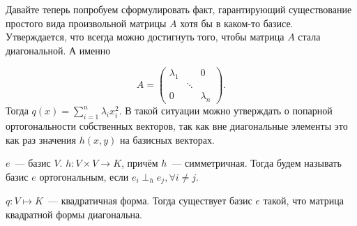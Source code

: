 Давайте теперь попробуем сформулировать факт, гарантирующий существование простого вида
произвольной матрицы $A$ хотя бы в каком-то базисе. Утверждается, что всегда можно
достигнуть того, чтобы матрица $A$ стала диагональной. А именно

\[
     A = 
     \begin{pmatrix}
         \lambda_ 1 & & 0 \\
        & \ddots & \\
        0& & \lambda_n
     \end{pmatrix}
.\] 
Тогда $q(x) = \sum\limits_{i=1}^{n}{\lambda_i x_i^2}$.
В такой ситуации можно утверждать о попарной ортогональности собственных векторов,
так как вне диагональные элементы это как раз значения $h(x,y)$ на базисных векторах.

\begin{definition}
    $e$~--- базис $V$. $h\colon V\times V\rightarrow K$, причём $h$~--- симметричная.
    Тогда будем называть базис  $e$ ортогональным, если $e_i\perp_h e_j, \forall i\not=j$.
\end{definition}
\begin{theorem}
    $q\colon V \mapsto K$~--- квадратичная форма. Тогда существует базис $e$ такой, что
    матрица квадратной формы диагональна.
\end{theorem}
